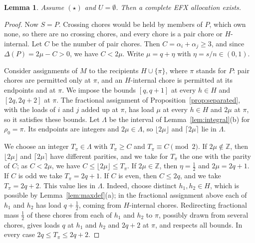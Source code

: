\documentclass{amsart}
\numberwithin{equation}{section}
\newtheorem{lemma}[theorem]{Lemma}
\theoremstyle{definition}
\theoremstyle{remark}
\begin{document}
\begin{lemma}\label{lem:SP}
Assume $(\star)$ and $U=\emptyset$. Then a complete EFX allocation exists.
\end{lemma}

\begin{proof}
Now $S=P$. Crossing chores would be held by members of $P$, which own none, so there are no crossing chores, and every chore is a pair chore or $H$-internal. Let $C$ be the number of pair chores. Then $C=\alpha_i+\alpha_j\ge3$, and since $\Delta(P)=2\mu-C>0$, we have $C<2\mu$. Write $\mu=q+\eta$ with $\eta=s/n\in(0,1)$.

Consider assignments of $M$ to the recipients $H\cup\{\pi\}$, where $\pi$ stands for $P$: pair chores are permitted only at $\pi$, and an $H$-internal chore is permitted at its endpoints and at $\pi$. We impose the bounds $[q,q+1]$ at every $h\in H$ and $[2q,2q+2]$ at $\pi$. The fractional assignment of Proposition~\ref{prop:separated}, with the loads of $i$ and $j$ added up at $\pi$, has load $\mu$ at every $h\in H$ and $2\mu$ at $\pi$, so it satisfies these bounds. Let $\Lambda$ be the interval of Lemma~\ref{lem:integral}(b) for $\rho_0=\pi$. Its endpoints are integers and $2\mu\in\Lambda$, so $\lfloor2\mu\rfloor$ and $\lceil2\mu\rceil$ lie in $\Lambda$.

We choose an integer $T_\pi\in\Lambda$ with $T_\pi\ge C$ and $T_\pi\equiv C\pmod 2$. If $2\mu\notin\mathbb Z$, then $\lfloor2\mu\rfloor$ and $\lceil2\mu\rceil$ have different parities, and we take for $T_\pi$ the one with the parity of $C$; as $C<2\mu$, we have $C\le\lfloor2\mu\rfloor\le T_\pi$. If $2\mu\in\mathbb Z$, then $\eta=\frac12$ and $2\mu=2q+1$. If $C$ is odd we take $T_\pi=2q+1$. If $C$ is even, then $C\le 2q$, and we take $T_\pi=2q+2$. This value lies in $\Lambda$. Indeed, choose distinct $h_1,h_2\in H$, which is possible by Lemma~\ref{lem:maxdef}(a); in the fractional assignment above each of $h_1$ and $h_2$ has load $q+\frac12$, coming from $H$-internal chores. Redirecting fractional mass $\frac12$ of these chores from each of $h_1$ and $h_2$ to $\pi$, possibly drawn from several chores, gives loads $q$ at $h_1$ and $h_2$ and $2q+2$ at $\pi$, and respects all bounds. In every case $2q\le T_\pi\le2q+2$.


\end{proof}
\end{document}
